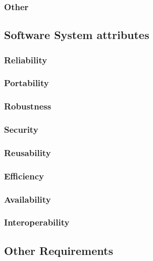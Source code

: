 \documentclass[english]{article}
\begin{document}
				 \subsubsection{Other}
				
					
									\newpage
				\subsection{Software System attributes}
				
				\subsubsection{Reliability}
    			
    				
				\subsubsection{Portability}
 
    				
				\subsubsection{Robustness}
    		
    				
				\subsubsection{Security}
    			
    				
				\subsubsection{Reusability}
	
				    
				\subsubsection{Efficiency}
				  
				\subsubsection{Availability}
				 
	
				\subsubsection{Interoperability}
				

				\subsection{Other Requirements}
				

	
\end{document}
